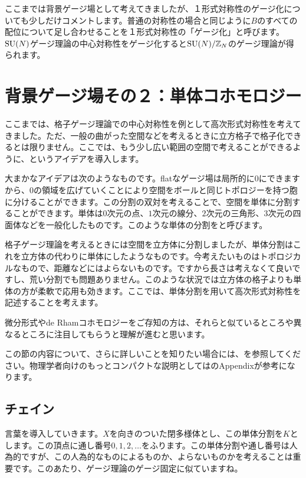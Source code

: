 \documentclass[generalized_symmetry.tex]{subfiles}
\begin{document}
ここまでは背景ゲージ場として考えてきましたが、１形式対称性のゲージ化についても少しだけコメントします。普通の対称性の場合と同じように$B$のすべての配位について足し合わせることを１形式対称性の「ゲージ化」と呼びます。$\mbox{SU}(N)$ゲージ理論の中心対称性をゲージ化すると$\mbox{SU}(N)/\mathbb{Z}_N$のゲージ理論が得られます。

\section{背景ゲージ場その２：単体コホモロジー}
ここまでは、格子ゲージ理論での中心対称性を例として高次形式対称性を考えてきました。ただ、一般の曲がった空間などを考えるときに立方格子で格子化できるとは限りません。ここでは、もう少し広い範囲の空間で考えることができるように、というアイデアを導入します。

大まかなアイデアは次のようなものです。flatなゲージ場は局所的に$0$にできますから、$0$の領域を広げていくことにより空間をボールと同じトポロジーを持つ胞に分けることができます。この分割の双対を考えることで、空間を単体に分割することができます。単体は$0$次元の点、$1$次元の線分、$2$次元の三角形、$3$次元の四面体などを一般化したものです。このような単体の分割をと呼びます。

格子ゲージ理論を考えるときには空間を立方体に分割しましたが、単体分割はこれを立方体の代わりに単体にしたようなものです。今考えたいものはトポロジカルなもので、距離などにはよらないものです。ですから長さは考えなくて良いですし、荒い分割でも問題ありません。このような状況では立方体の格子よりも単体の方が柔軟で応用も効きます。ここでは、単体分割を用いて高次形式対称性を記述することを考えます。

微分形式やde Rhamコホモロジーをご存知の方は、それらと似ているところや異なるところに注目してもらうと理解が進むと思います。

この節の内容について、さらに詳しいことを知りたい場合には、\cite{Hatcher:478079}を参照してください。物理学者向けのもっとコンパクトな説明としては\cite{Benini:2018reh}のAppendixが参考になります。

\subsection{チェイン}
言葉を導入していきます。$X$を向きのついた閉多様体とし、この単体分割を$K$とします。この頂点に通し番号$0,1,2,\dots$をふります。この単体分割や通し番号は人為的ですが、この人為的なものによるものか、よらないものかを考えることは重要です。このあたり、ゲージ理論のゲージ固定に似ていますね。
\end{document}
